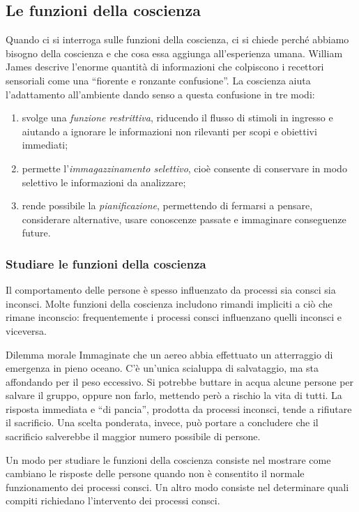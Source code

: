\documentclass[a4paper]{article}
\begin{document}
\subsection{Le funzioni della coscienza}
Quando ci si interroga sulle funzioni della coscienza, ci si chiede perché abbiamo bisogno della coscienza e che cosa essa aggiunga all'esperienza umana.
William James descrive l'enorme quantità di informazioni che colpiscono i recettori sensoriali come una ``fiorente e ronzante confusione''. La coscienza aiuta l'adattamento all'ambiente dando senso a questa confusione in tre modi:
\begin{enumerate}
    \item svolge una \emph{funzione restrittiva}, riducendo il flusso di stimoli in ingresso e aiutando a ignorare le informazioni non rilevanti per scopi e obiettivi immediati;
    \item permette l'\emph{immagazzinamento selettivo}, cioè consente di conservare in modo selettivo le informazioni da analizzare;
    \item rende possibile la \emph{pianificazione}, permettendo di fermarsi a pensare, considerare alternative, usare conoscenze passate e immaginare conseguenze future.
\end{enumerate}
\subsubsection{Studiare le funzioni della coscienza}
Il comportamento delle persone è spesso influenzato da processi sia consci sia inconsci. Molte funzioni della coscienza includono rimandi impliciti a ciò che rimane inconscio: frequentemente i processi consci influenzano quelli inconsci e viceversa.
\begin{snippetexample}{Dilemma morale}
    Immaginate che un aereo abbia effettuato un atterraggio di emergenza in pieno oceano. C'è un'unica scialuppa di salvataggio, ma sta affondando per il peso eccessivo. Si potrebbe buttare in acqua alcune persone per salvare il gruppo, oppure non farlo, mettendo però a rischio la vita di tutti. La risposta immediata e ``di pancia'', prodotta da processi inconsci, tende a rifiutare il sacrificio. Una scelta ponderata, invece, può portare a concludere che il sacrificio salverebbe il maggior numero possibile di persone.
\end{snippetexample}
Un modo per studiare le funzioni della coscienza consiste nel mostrare come cambiano le risposte delle persone quando non è consentito il normale funzionamento dei processi consci. Un altro modo consiste nel determinare quali compiti richiedano l'intervento dei processi consci.
\end{document}
